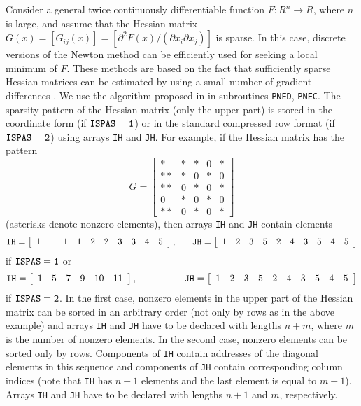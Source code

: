 \documentclass{esub2acm}
\newcommand{\beq}{\begin{eqnarray*}}
\newcommand{\eeq}{\end{eqnarray*}}
\begin{document}
\vspace{8mm}


\vspace{3mm}

\noindent Consider a general twice continuously differentiable
function $F:R^n \to R$, where $n$ is large, and assume that the
Hessian matrix $G(x) = [G_{ij}(x)] = [\partial^2 F(x)/(\partial x_i
\partial x_j)]$ is sparse. In this case, discrete versions of the
Newton method can be efficiently used for seeking a local minimum of
$F$. These methods are based on the fact that sufficiently sparse
Hessian matrices can be estimated by using a small number of
gradient differences \cite{com1}. We use the algorithm proposed in
\cite{tum1} in subroutines {\tt PNED}, {\tt PNEC}. The sparsity
pattern of the Hessian matrix (only the upper part) is stored
in the coordinate form (if ${\tt ISPAS=1}$) or in the standard
compressed row format (if ${\tt ISPAS=2}$) using arrays {\tt IH}
and {\tt JH}. For example, if the Hessian matrix has the
pattern
%
$$G = \left[ \begin{array}{ccccc}
  * & * & * & 0 & * \\
* * & * & 0 & * & 0 \\
* * & 0 & * & 0 & * \\
  0 & * & 0 & * & 0 \\
* * & 0 & * & 0 & *
\end{array} \right]$$
%
(asterisks denote nonzero elements), then arrays {\tt IH} and {\tt JH}
contain elements
%
\beq
{\tt IH} = \left[ \begin{array}{cccccccccc}
1 & 1 & 1 & 1 & 2 & 2 & 3 & 3 & 4 & 5
\end{array} \right], \quad \; \; \,
{\tt JH} = \left[ \begin{array}{cccccccccc}
1 & 2 & 3 & 5 & 2 & 4 & 3 & 5 & 4 & 5
\end{array} \right]
\eeq
if ${\tt ISPAS=1}$ or
%
\beq
{\tt IH} = \left[ \begin{array}{cccccc}
1 & 5 & 7 & 9 & 10 & 11
\end{array} \right], \qquad \qquad \quad
{\tt JH} = \left[ \begin{array}{cccccccccc}
1 & 2 & 3 & 5 & 2 & 4 & 3 & 5 & 4 & 5
\end{array} \right]
\eeq
%
if ${\tt ISPAS=2}$. In the first case, nonzero elements in the upper part of
the Hessian matrix can be sorted in an arbitrary order (not only by
rows as in the above example) and arrays {\tt IH} and {\tt JH} have to be declared
with lengths $n+m$, where $m$ is the number of nonzero elements.
In the second case, nonzero elements can be sorted only by rows.
Components of {\tt IH} contain addresses of the diagonal elements in this
sequence and components of {\tt JH} contain corresponding column indices
(note that {\tt IH} has $n+1$ elements and the last element is equal to $m+1$).
Arrays {\tt IH} and {\tt JH} have to be declared with lengths $n+1$ and $m$,
respectively.
\end{document}
